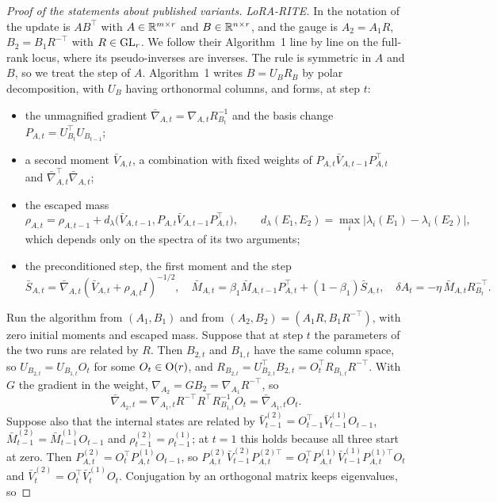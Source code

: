 \begin{proof}[Proof of the statements about published variants]
\emph{LoRA-RITE.} In the notation of \citet{yen2024lora} the update is $AB^\top$ with $A\in\mathbb{R}^{m\times r}$ and
$B\in\mathbb{R}^{n\times r}$, and the gauge is $A_2=A_1R$, $B_2=B_1R^{-\top}$ with $R\in\mathrm{GL}_r$. We follow their Algorithm~1 line
by line on the full-rank locus, where its pseudo-inverses are inverses. The rule is symmetric in $A$ and $B$, so we treat
the step of $A$. Algorithm~1 writes $B=U_BR_B$ by polar decomposition, with $U_B$ having orthonormal columns, and
forms, at step $t$:
\begin{itemize}
\item the unmagnified gradient $\bar\nabla_{A,t}=\nabla_{A,t}R_{B_t}^{-1}$ and the basis change
$P_{A,t}=U_{B_t}^\top U_{B_{t-1}}$;
\item a second moment $\bar V_{A,t}$, a combination with fixed weights of $P_{A,t}\bar V_{A,t-1}P_{A,t}^\top$ and
$\bar\nabla_{A,t}^\top\bar\nabla_{A,t}$;
\item the escaped mass
\[\rho_{A,t}=\rho_{A,t-1}+d_\lambda\big(\bar V_{A,t-1},P_{A,t}\bar V_{A,t-1}P_{A,t}^\top\big),\qquad
d_\lambda(E_1,E_2)=\max_i\lvert\lambda_i(E_1)-\lambda_i(E_2)\rvert,\]
which depends only on the spectra of its two arguments;
\item the preconditioned step, the first moment and the step
\[\bar S_{A,t}=\bar\nabla_{A,t}(\bar V_{A,t}+\rho_{A,t}I)^{-1/2},\quad
\bar M_{A,t}=\beta_1\bar M_{A,t-1}P_{A,t}^\top+(1-\beta_1)\bar S_{A,t},\quad
\delta A_t=-\eta\,\bar M_{A,t}R_{B_t}^{-\top}.\]
\end{itemize}
Run the algorithm from $(A_1,B_1)$ and from $(A_2,B_2)=(A_1R,B_1R^{-\top})$, with zero initial moments and escaped
mass. Suppose that at step $t$ the parameters of the two runs are related by $R$. Then $B_{2,t}$ and $B_{1,t}$ have the
same column space, so $U_{B_{2,t}}=U_{B_{1,t}}O_t$ for some $O_t\in\mathrm{O}(r)$, and
$R_{B_{2,t}}=U_{B_{2,t}}^\top B_{2,t}=O_t^\top R_{B_{1,t}}R^{-\top}$. With $G$ the gradient in the weight,
$\nabla_{A_2}=GB_2=\nabla_{A_1}R^{-\top}$, so
\[\bar\nabla_{A_2,t}=\nabla_{A_1,t}R^{-\top}R^\top R_{B_{1,t}}^{-1}O_t=\bar\nabla_{A_1,t}O_t.\]
Suppose also that the internal states are related by $\bar V^{(2)}_{t-1}=O_{t-1}^\top\bar V^{(1)}_{t-1}O_{t-1}$,
$\bar M^{(2)}_{t-1}=\bar M^{(1)}_{t-1}O_{t-1}$ and $\rho^{(2)}_{t-1}=\rho^{(1)}_{t-1}$; at $t=1$ this holds because all
three start at zero. Then $P^{(2)}_{A,t}=O_t^\top P^{(1)}_{A,t}O_{t-1}$, so
$P^{(2)}_{A,t}\bar V^{(2)}_{t-1}P^{(2)\top}_{A,t}=O_t^\top P^{(1)}_{A,t}\bar V^{(1)}_{t-1}P^{(1)\top}_{A,t}O_t$ and
$\bar V^{(2)}_t=O_t^\top\bar V^{(1)}_tO_t$. Conjugation by an orthogonal matrix keeps eigenvalues, so

\end{proof}
